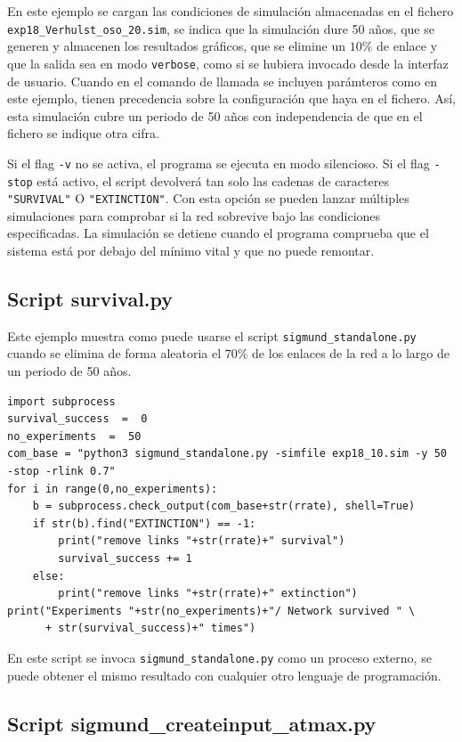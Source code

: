 En este ejemplo se cargan las condiciones de simulación almacenadas en el fichero \texttt{exp18\_Verhulst\_oso\_20.sim}, se indica que la simulación dure 50 años, que se generen y almacenen los resultados gráficos, que se elimine un $10\%$ de enlace y que la salida sea en modo \texttt{verbose}, como si se hubiera invocado desde la interfaz de usuario. Cuando en el comando de llamada se incluyen parámteros como en este ejemplo, tienen precedencia sobre la configuración que haya en el fichero. Así, esta simulación cubre un periodo de 50 años con independencia de que en el fichero se indique otra cifra.  

Si el flag \texttt{-v} no se activa, el programa se ejecuta en modo silencioso. Si el flag \texttt{-stop} está activo, el script devolverá tan solo las cadenas de caracteres \texttt{"SURVIVAL"} O \texttt{"EXTINCTION"}. Con esta opción se pueden lanzar múltiples simulaciones para comprobar si la red sobrevive bajo las condiciones especificadas. La simulación se detiene cuando el programa comprueba que el sistema está por debajo del mínimo vital y que no puede remontar.


\subsection{Script survival.py}

\noindent Este ejemplo muestra como puede usarse el script \texttt{sigmund\_standalone.py} cuando se elimina de forma aleatoria el $70\%$ de los enlaces de la red a lo largo de un periodo de 50 años.

\fontsize{3mm}{3mm}\selectfont
\begin{verbatim}
import subprocess
survival_success  =  0
no_experiments  =  50
com_base = "python3 sigmund_standalone.py -simfile exp18_10.sim -y 50 -stop -rlink 0.7"
for i in range(0,no_experiments):
    b = subprocess.check_output(com_base+str(rrate), shell=True)
    if str(b).find("EXTINCTION") == -1:
        print("remove links "+str(rrate)+" survival")
        survival_success += 1
    else:
        print("remove links "+str(rrate)+" extinction")
print("Experiments "+str(no_experiments)+"/ Network survived " \
      + str(survival_success)+" times")
\end{verbatim}
\normalsize

En este script se invoca \texttt{sigmund\_standalone.py} como un proceso externo, se puede obtener el mismo resultado con cualquier
otro lenguaje de programación.

\subsection{Script sigmund\_createinput\_atmax.py}


